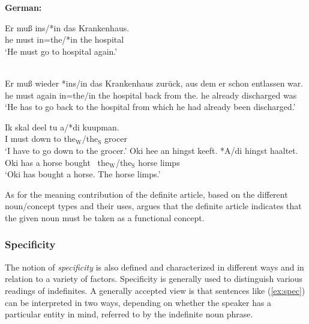 \documentclass[output=paper]{langsci/langscibook}
\begin{document}
\begin{samepage}
\begin{exe}
\ex\label{ex:loebner.exs}
{\bf{German:}}
	\begin{xlista}
	\ex
	\gll Er {mu\ss} {ins/*in das} Krankenhaus.\\			
	he must {in=the/*in the} hospital\\
	\glt `He must go to hospital again.'\\\ 
	\hfill\citep[from][ex.52, our glosses]{lobner:85}
	
	\ex
	\gll Er {mu\ss} wieder {*ins/in das} Krankenhaus zurück, aus dem er schon entlassen war.\\
	he must again {in=the/in the} hospital back from the.{\sc{dat}} he already discharged was\\
	\glt `He has to go back to the hospital from which he had already been discharged.' \hfill\citep[from][ex.54, our glosses]{lobner:85}
	\end{xlista}
\end{exe}	
\end{samepage}

\begin{samepage}
\begin{exe}
\ex {\bf{Fering (F\"ohr):}} \hfill\citep[][p.161]{ebert:71}
	\begin{xlista}
	\ex
	\gll Ik skal deel tu a/*di kuupman. \\
	I must down to the$_{\text{W}}$/the$_{\text{S}}$ grocer \\
	\glt `I have to go down to the grocer.'
	\ex
	\gll Oki hee an hingst keeft. *A/di hingst haaltet. \\
	Oki has a horse bought \ the$_{\text{W}}$/the$_{\text{S}}$ horse limps \\
	\glt `Oki has bought a horse. The horse limps.'	
	\end{xlista}
\end{exe}
\end{samepage}

As for the meaning contribution of the definite article, based on the different noun/concept types and their uses, \citet{lobner:85} argues that the definite article indicates that the given noun must be taken as a functional concept. 

\subsubsection{Specificity}
The notion of {\emph{specificity}} \citep[see, e.\,g.,][]{vonheus:11} is also defined and characterized in different ways and in relation to a variety of factors. Specificity is generally used to distinguish various readings of indefinites. A generally accepted view is that sentences like (\ref{ex:spec}) can be interpreted in two ways, depending on whether the speaker has a particular entity in mind, referred to by the indefinite noun phrase.
\end{document}
